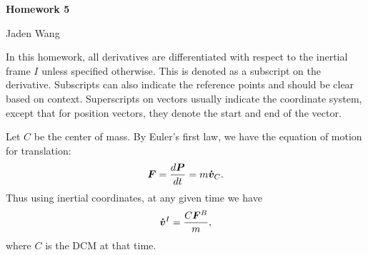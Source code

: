 \documentclass[12pt]{article}
\begin{document}
\centerline {\textsf{\textbf{\LARGE{Homework 5}}}}
\centerline {Jaden Wang}
\vspace{.15in}
In this homework, all derivatives are differentiated with respect to the inertial frame $ I$ unless specified otherwise. This is denoted as a subscript on the derivative. Subscripts can also indicate the reference points and should be clear based on context. Superscripts on vectors usually indicate the coordinate system, except that for position vectors, they denote the start and end of the vector.
\begin{problem}[1]
Let $ C$ be the center of mass. By Euler's first law, we have the equation of motion for translation:
\begin{align}
	{\bm{ F}}  = \frac{d {\bm{ P}} }{d t} = m {\bm{ \dot{v}}}_{C}.
\end{align}
Thus using inertial coordinates, at any given time we have
\begin{align}
	{\bm{ \dot{v}}}^{I} = \frac{C {\bm{ F}}^{B} }{m }  ,
\end{align}
where $ C$ is the DCM at that time.


\end{problem}
\end{document}
